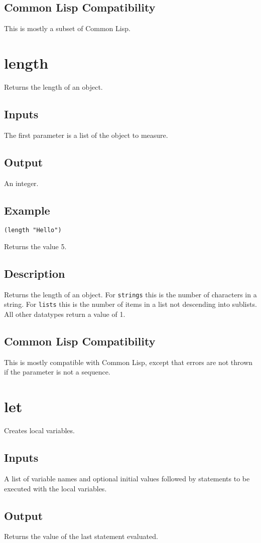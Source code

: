 \documentclass[10pt, openany]{book}
\newcommand{\datatype}[1]{\texttt{#1}}
\newcommand{\cl}{Common Lisp}
\begin{document}
\subsection{Common Lisp Compatibility}
This is mostly a subset of \cl.

\section{length}
Returns the length of an object.
\subsection{Inputs}
The first parameter is a list of the object to measure.
\subsection{Output}
An integer.
\subsection{Example}
\begin{lstlisting}
(length "Hello")
\end{lstlisting}
Returns the value 5.
\subsection{Description}
Returns the length of an object.  For \datatype{strings} this is the number of characters in a string.  For \datatype{lists} this is the number of items in a list not descending into sublists.  All other datatypes return a value of 1.
\subsection{Common Lisp Compatibility}
This is mostly compatible with \cl, except that errors are not thrown if the parameter is not a sequence.

\section{let}
Creates local variables.
\subsection{Inputs}
A list of variable names and optional initial values followed by statements to be executed with the local variables.
\subsection{Output}
Returns the value of the last statement evaluated.
\end{document}
